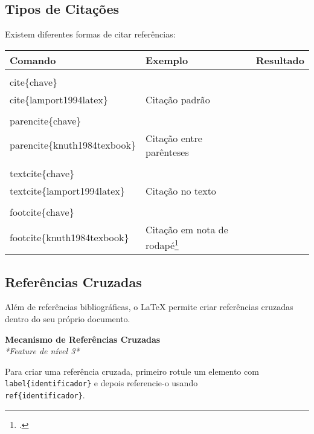 \subsection{Tipos de Citações}

Existem diferentes formas de citar referências:

\begin{rpgtable}
\begin{tabular}{|l|l|p{8cm}|}
\hline
\textbf{Comando} & \textbf{Exemplo} & \textbf{Resultado} \\
\hline
\texttt{\\cite\{chave\}} & \texttt{\\cite\{lamport1994latex\}} & Citação padrão \cite{lamport1994latex} \\
\hline
\texttt{\\parencite\{chave\}} & \texttt{\\parencite\{knuth1984texbook\}} & Citação entre parênteses \parencite{knuth1984texbook} \\
\hline
\texttt{\\textcite\{chave\}} & \texttt{\\textcite\{lamport1994latex\}} & Citação no texto \textcite{lamport1994latex} \\
\hline
\texttt{\\footcite\{chave\}} & \texttt{\\footcite\{knuth1984texbook\}} & Citação em nota de rodapé\footcite{knuth1984texbook} \\
\hline
\end{tabular}
\end{rpgtable}

\subsection{Referências Cruzadas}

Além de referências bibliográficas, o LaTeX permite criar referências cruzadas dentro do seu próprio documento.

\begin{spell}
\textbf{Mecanismo de Referências Cruzadas}\\
\textit{*Feature de nível 3*}

Para criar uma referência cruzada, primeiro rotule um elemento com \texttt{\\label\{identificador\}} e depois referencie-o usando \texttt{\\ref\{identificador\}}.
\end{spell}

